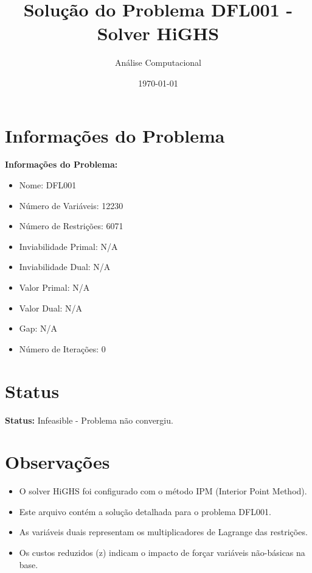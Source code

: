 \documentclass[12pt]{article}
\title{Solução do Problema DFL001 - Solver HiGHS}
\author{Análise Computacional}
\date{\today}
\begin{document}
\maketitle

\section{Informações do Problema}

\textbf{Informações do Problema:}
\begin{itemize}
\item Nome: DFL001
\item Número de Variáveis: 12230
\item Número de Restrições: 6071
\item Inviabilidade Primal: N/A
\item Inviabilidade Dual: N/A
\item Valor Primal: N/A
\item Valor Dual: N/A
\item Gap: N/A
\item Número de Iterações: 0
\end{itemize}


\section{Status}

\textbf{Status:} Infeasible - Problema não convergiu.


\section{Observações}

\begin{itemize}
\item O solver HiGHS foi configurado com o método IPM (Interior Point Method).
\item Este arquivo contém a solução detalhada para o problema DFL001.
\item As variáveis duais representam os multiplicadores de Lagrange das restrições.
\item Os custos reduzidos (z) indicam o impacto de forçar variáveis não-básicas na base.
\end{itemize}
\end{document}
